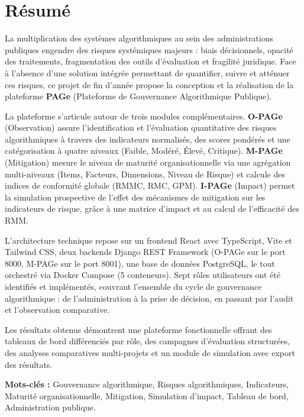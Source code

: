 \chapter*{Résumé}

La multiplication des systèmes algorithmiques au sein des administrations publiques engendre des risques systémiques majeurs : biais décisionnels, opacité des traitements, fragmentation des outils d'évaluation et fragilité juridique. Face à l'absence d'une solution intégrée permettant de quantifier, suivre et atténuer ces risques, ce projet de fin d'année propose la conception et la réalisation de la plateforme \textbf{PAGe} (Plateforme de Gouvernance Algorithmique Publique).

La plateforme s'articule autour de trois modules complémentaires. \textbf{O-PAGe} (Observation) assure l'identification et l'évaluation quantitative des risques algorithmiques à travers des indicateurs normalisés, des scores pondérés et une catégorisation à quatre niveaux (Faible, Modéré, Élevé, Critique). \textbf{M-PAGe} (Mitigation) mesure le niveau de maturité organisationnelle via une agrégation multi-niveaux (Items, Facteurs, Dimensions, Niveau de Risque) et calcule des indices de conformité globale (RMMC, RMC, GPM). \textbf{I-PAGe} (Impact) permet la simulation prospective de l'effet des mécanismes de mitigation sur les indicateurs de risque, grâce à une matrice d'impact et au calcul de l'efficacité des RMM.

L'architecture technique repose sur un frontend React avec TypeScript, Vite et Tailwind CSS, deux backends Django REST Framework (O-PAGe sur le port 8000, M-PAGe sur le port 8001), une base de données PostgreSQL, le tout orchestré via Docker Compose (5 conteneurs). Sept rôles utilisateurs ont été identifiés et implémentés, couvrant l'ensemble du cycle de gouvernance algorithmique : de l'administration à la prise de décision, en passant par l'audit et l'observation comparative.

Les résultats obtenus démontrent une plateforme fonctionnelle offrant des tableaux de bord différenciés par rôle, des campagnes d'évaluation structurées, des analyses comparatives multi-projets et un module de simulation avec export des résultats.

\vspace{0.5cm}
\noindent\textbf{Mots-clés :} Gouvernance algorithmique, Risques algorithmiques, Indicateurs, Maturité organisationnelle, Mitigation, Simulation d'impact, Tableau de bord, Administration publique.
